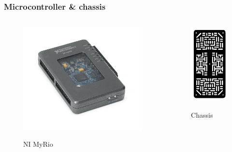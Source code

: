 \documentclass
   [kulak] %
   {kulakbeamer}
\begin{document}
\begin{frame}
	\frametitle{Microcontroller \& chassis}
	\begin{columns}
		\begin{figure}
			\centering
			\includegraphics[width=.7\textwidth]{NI-myrio}
		\caption{NI MyRio}\cite{nimyrio}
		\end{figure}
		\begin{figure}
			\centering
			\includegraphics[width=.45\textwidth]{chassis}
			\caption{Chassis}\cite{RobotChassisRechthoekigZwart}
		\end{figure}
		
	\end{columns}
	
\end{frame}
\end{document}
